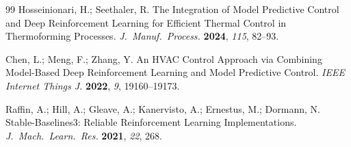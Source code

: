 \documentclass[processes,article,submit,moreauthors,pdftex]{Definitions/mdpi}
\begin{document}
\begin{thebibliography}{99}
Hosseinionari, H.; Seethaler, R.
The Integration of Model Predictive Control and Deep Reinforcement Learning
for Efficient Thermal Control in Thermoforming Processes.
\textit{J.\ Manuf.\ Process.} \textbf{2024}, \textit{115}, 82--93.

Chen, L.; Meng, F.; Zhang, Y.
An HVAC Control Approach via Combining Model-Based Deep Reinforcement
Learning and Model Predictive Control.
\textit{IEEE Internet Things J.} \textbf{2022}, \textit{9}, 19160--19173.

Raffin, A.; Hill, A.; Gleave, A.; Kanervisto, A.; Ernestus, M.; Dormann, N.
Stable-Baselines3: Reliable Reinforcement Learning Implementations.
\textit{J.\ Mach.\ Learn.\ Res.} \textbf{2021}, \textit{22}, 268.

\end{thebibliography}
\end{document}
